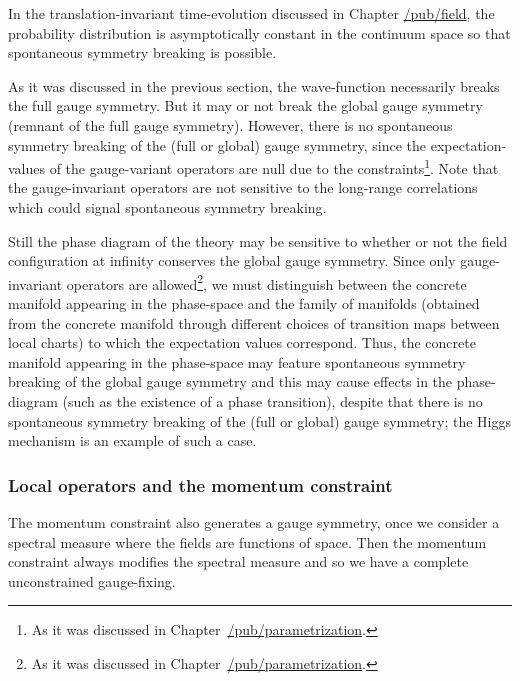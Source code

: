 \documentclass[11pt]{book}
\begin{document}
In the translation-invariant time-evolution discussed in Chapter
\href{https://timepiece.pubpub.org/pub/field}{/pub/field}, the
probability distribution is asymptotically constant in the continuum
space so that spontaneous symmetry breaking is possible.

As it was discussed in the previous section, the wave-function
necessarily breaks the full gauge symmetry. But it may or not break the
global gauge symmetry (remnant of the full gauge symmetry). However,
there is no spontaneous symmetry breaking of the (full or global) gauge
symmetry, since the expectation-values of the gauge-variant operators
are null due to the constraints\footnote{As it was discussed in
  Chapter~\href{https://timepiece.pubpub.org/pub/parametrization/\#gauge-transformations-constrained-systems-and-conditioned-probability}{/pub/parametrization}.}.
Note that the gauge-invariant operators are not sensitive to the
long-range correlations which could signal spontaneous symmetry
breaking\cite{Elitzur1975Impossibility}.

Still the phase diagram of the theory may be sensitive to whether or not
the field configuration at infinity conserves the global gauge symmetry.
Since only gauge-invariant operators are allowed\footnote{As it was
  discussed in
  Chapter~\href{https://timepiece.pubpub.org/pub/parametrization/\#gauge-transformations-constrained-systems-and-conditioned-probability}{/pub/parametrization}.},
we must distinguish between the concrete manifold appearing in the
phase-space and the family of manifolds (obtained from the concrete
manifold through different choices of transition maps between local
charts) to which the expectation values correspond. Thus, the concrete
manifold appearing in the phase-space may feature spontaneous symmetry
breaking of the global gauge symmetry and this may cause effects in the
phase-diagram (such as the existence of a phase transition), despite
that there is no spontaneous symmetry breaking of the (full or global)
gauge symmetry; the Higgs mechanism is an example of such a case.

\hypertarget{local-operators-and-the-momentum-constraint}{%
\subsubsection{Local operators and the momentum
constraint}\label{local-operators-and-the-momentum-constraint}}

The momentum constraint also generates a gauge symmetry, once we
consider a spectral measure where the fields are functions of space.
Then the momentum constraint always modifies the spectral measure and so
we have a complete unconstrained gauge-fixing.
\end{document}
